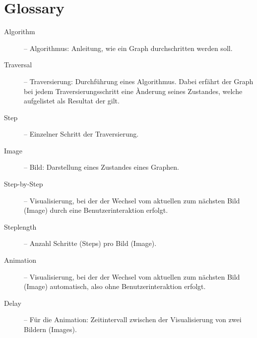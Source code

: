 \section{Glossary}
\label{sec:Glossary}
\begin{description}
  \item[Algorithm] -- Algorithmus: Anleitung, wie ein Graph durchschritten werden soll.
  \item[Traversal] -- Traversierung: Durchf\"uhrung eines Algorithmus. Dabei erf\"ahrt der Graph bei jedem Traversierungsschritt eine \`Anderung seines Zustandes, welche aufgelistet als Resultat der  gilt.
  \item[Step] -- Einzelner Schritt der Traversierung.
  \item[Image] -- Bild: Darstellung eines Zustandes eines Graphen.
  \item[Step-by-Step] -- Visualisierung, bei der der Wechsel vom aktuellen zum n\"achsten Bild (Image) durch eine Benutzerinteraktion erfolgt.
  \item[Steplength] -- Anzahl Schritte (Steps) pro Bild (Image).
  \item[Animation] -- Visualisierung, bei der der Wechsel vom aktuellen zum n\"achsten Bild (Image) automatisch, also ohne Benutzerinteraktion erfolgt.
  \item[Delay] -- F\"ur die Animation: Zeitintervall zwischen der Visualisierung von zwei Bildern (Images).
\end{description}